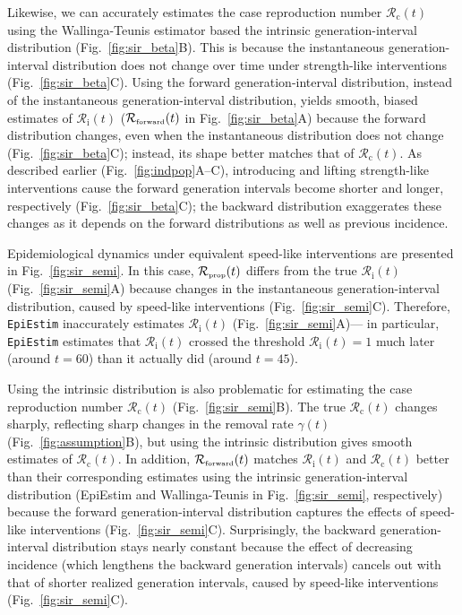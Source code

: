 \documentclass[12pt]{article}
\newcommand{\fref}[1]{Fig.~\ref{fig:#1}}
\newcommand{\Rx}[1]{\ensuremath{{\mathcal R}_{#1}}\xspace}
\newcommand{\Rc}{\Rx{\mathrm{c}}}
\newcommand{\Ri}{\Rx{\mathrm{i}}}
\newcommand{\RR}{\ensuremath{{\mathcal R}}\xspace}
\newcommand{\tsub}[2]{#1_{{\textrm{\tiny #2}}}}
\begin{document}
Likewise, we can accurately estimates the case reproduction number $\Rc(t)$ using the Wallinga-Teunis estimator based the intrinsic generation-interval distribution (\fref{sir_beta}B).
This is because the instantaneous generation-interval distribution does not change over time under strength-like interventions (\fref{sir_beta}C).
Using the forward generation-interval distribution, instead of the instantaneous generation-interval distribution, yields smooth, biased estimates of $\Ri(t)$ ($\tsub{\RR}{forward}(t)$ in \fref{sir_beta}A) because the forward distribution changes, even when the instantaneous distribution does not change (\fref{sir_beta}C);
instead, its shape better matches that of $\Rc(t)$.
As described earlier (\fref{indpop}A--C), introducing and lifting strength-like interventions cause the forward generation intervals become shorter and longer, respectively (\fref{sir_beta}C);
the backward distribution exaggerates these changes as it depends on the forward distributions as well as previous incidence.

Epidemiological dynamics under equivalent speed-like interventions are presented in \fref{sir_semi}.
In this case, $\tsub{\RR}{prop}(t)$ differs from the true $\Ri(t)$ (\fref{sir_semi}A) because changes in the instantaneous generation-interval distribution, caused by speed-like interventions (\fref{sir_semi}C).
Therefore, \texttt{EpiEstim} inaccurately estimates $\Ri(t)$ (\fref{sir_semi}A)---
in particular, \texttt{EpiEstim} estimates that $\Ri(t)$ crossed the threshold $\Ri(t)=1$ much later (around $t=60$) than it actually did (around $t=45$).

Using the intrinsic distribution is also problematic for estimating the case reproduction number $\Rc(t)$ (\fref{sir_semi}B).
The true $\Rc(t)$ changes sharply, reflecting sharp changes in the removal rate $\gamma(t)$ (\fref{assumption}B), but using the intrinsic distribution gives smooth estimates of $\Rc(t)$.
In addition, $\tsub{\RR}{forward}(t)$ matches $\Ri(t)$ and $\Rc(t)$ better than their corresponding estimates using the intrinsic generation-interval distribution (EpiEstim and Wallinga-Teunis in \fref{sir_semi}, respectively) because the forward generation-interval distribution captures the effects of speed-like interventions (\fref{sir_semi}C).
Surprisingly, the backward generation-interval distribution stays nearly constant because the effect of decreasing incidence (which lengthens the backward generation intervals) cancels out with that of shorter realized generation intervals, caused by speed-like interventions (\fref{sir_semi}C).
\end{document}
